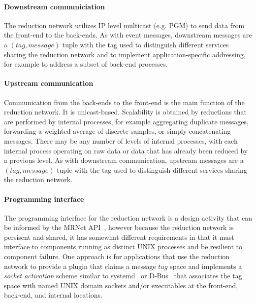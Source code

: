 \ifcomments
{}
\fi
\paragraph{Downstream communiciation}
The reduction network utilizes IP level multicast (e.g. PGM) to send
data from the front-end to the back-ends.
As with event messages, downstream messages are a
$(tag, message)$ tuple with the tag used to distinguish different
services sharing the reduction network and to implement application-specific
addressing, for example to address a subset of back-end processes.

\paragraph{Upstream communication}
Communication from the back-ends to the front-end is the main function
of the reduction network.  It is unicast-based.  Scalability is obtained
by reductions that are performed by internal processes, for example
aggregating duplicate messages, forwarding a weighted average of discrete
samples, or simply concatenating messages.
There may be any number of levels of internal
processes, with each internal process operating on raw data or data
that has already been reduced by a previous level.
As with downstream communication, upstream messages are a
$(tag, message)$ tuple with the tag used to distinguish different
services sharing the reduction network.

\paragraph{Programming interface}
The programming interface for the reduction network is a design
activity that can be informed by the MRNet API~\cite{MRNetAPI}, however
because the reduction network is persisent and shared, it has somewhat
different requirements in that it must interface to components running
as distinct UNIX processes and be resilient to component failure.
One approach is for applications that use the reduction
network to provide a plugin that claims a message $tag$ space and implements
a {\em socket activation} scheme similar to systemd~\cite{Systemd}
or D-Bus~\cite{Dbus} that associates the tag space with named UNIX
domain sockets and/or executables at the front-end, back-end, and internal
locations.

